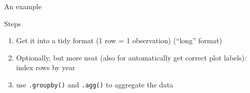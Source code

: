 \documentclass{beamer}
\begin{document}
\begin{frame}[plain]
An example
\end{frame}


{
	\begin{frame}[plain]
\end{frame}
}

\begin{frame}{Steps}
\begin{enumerate}
	\item Get it into a tidy format (1 row = 1 observation) (``long'' format)
	\item Optionally, but more neat (also for automatically get correct plot labels): \\ index rows by year
	\item use \texttt{.groupby()} and \texttt{.agg()} to aggregate the data
\end{enumerate}
\end{frame}


{
	\begin{frame}[plain]
\end{frame}
}
\end{document}
